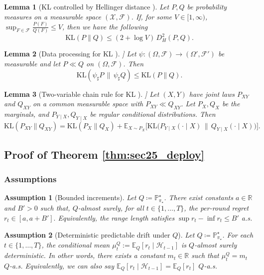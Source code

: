 \documentclass[11pt]{article}
\newtheorem{lemma}{Lemma}
\newtheorem{assumption}{Assumption}
\providecommand{\R}{\mathbb{R}}
\renewcommand{\P}{\mathbb{P}}
\providecommand{\E}{\mathbb{E}}
\begin{document}
\begin{lemma}[KL controlled by Hellinger distance {\cite[Lemma A.10]{foster2021statistical}}]
\label{lem:kl-le-hellinger}
Let $P,Q$ be probability measures on a measurable space $(\mathcal X,\mathcal F)$. If, for some $V\in[1,\infty)$, $\sup_{F\in\mathcal F}\frac{P(F)}{Q(F)} \le V$, then we have the following
\[
\mathrm{KL}(P\|Q)\le (2+\log V)\,D_H^2(P,Q).
\]
\end{lemma}

\begin{lemma}[Data processing for KL {\cite[Thm.~7.4]{PolyanskiyWu2025}}]]
\label{lem:dp-kl}
Let $\psi:(\Omega,\mathcal F)\to(\Omega',\mathcal F')$ be measurable and let $P\ll Q$ on $(\Omega,\mathcal F)$.
Then
\[
\mathrm{KL}(\psi_\sharp P \,\|\, \psi_\sharp Q) \le \mathrm{KL}(P\|Q).
\]
\end{lemma}


\begin{lemma}[Two-variable chain rule for KL {\cite[Lemma 40]{suggala2024second}}]] \label{lem:two-var-chain-rule}
Let $(X,Y)$ have joint laws $P_{XY}$ and $Q_{XY}$ on a common measurable space with $P_{XY}\ll Q_{XY}$.
Let $P_X,Q_X$ be the marginals, and $P_{Y\mid X},Q_{Y\mid X}$ be regular conditional distributions.
Then
\[
\mathrm{KL}(P_{XY}\|Q_{XY})
=
\mathrm{KL}(P_X\|Q_X)
+
\mathbb{E}_{X\sim P_X}\Big[\mathrm{KL}\big(P_{Y\mid X}(\cdot\mid X)\,\|\,Q_{Y\mid X}(\cdot\mid X)\big)\Big].
\]
\end{lemma}



\subsection{Proof of Theorem \ref{thm:sec25_deploy}}
\label{apx:first_proof}

\subsubsection{Assumptions}

\begin{assumption}[Bounded increments]\label{ass:bounded}
Let \(Q\coloneqq \P^\star_{\pi_\star}\). There exist constants $a\in\R$ and $B'>0$ such that, $Q$-almost surely, for all
$t\in\{1,\dots,T\}$, the per-round regret
\(
r_t \in [a,a+B'].
\)
Equivalently, the range length satisfies $\sup r_t - \inf r_t \le B'$ a.s.
\end{assumption}

\begin{assumption}[Deterministic predictable drift under $Q$]\label{ass:det_drift}
Let \(Q\coloneqq \P^\star_{\pi_\star}\).
For each $t\in\{1,\dots,T\}$, the conditional mean
\(
\mu_t^Q := \E_Q[r_t \mid \mathcal H_{t-1}]
\)
is $Q$-almost surely deterministic. In other words, there exists a constant $m_t\in\R$ such that
$\mu_t^Q = m_t$ $Q$-a.s. Equivalently, we can also say $\E_Q[r_t \mid \mathcal H_{t-1}] = \E_Q[r_t]$ $Q$-a.s.
\end{assumption}
\end{document}
